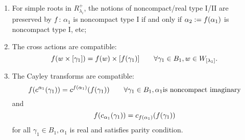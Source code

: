 \documentclass[12pt,a4paper]{amsart}
\newcommand{\trivial}[2][]{\if\relax\detokenize{#1}\relax
  {%
      \color{orange} \vspace{0em} $[$  #2 $]$
      \color{black}
  }
  \else
\ifx#1h
\ifcsname showtrivial\endcsname
{%
    \color{orange} \vspace{0em}  $[$ #2 $]$
    \color{black}
}
\fi
\else {\red Wrong argument!} \fi
\fi
}
\numberwithin{equation}{section}
\theoremstyle{remark}
\newcommand{\cross}{\times}
\begin{document}
\begin{enumerate}[KLff]
\begin{enumerate}[label=(\alph*)]
          \item For simple roots in $R^{+}_{\lambda_{i}}$, the notions of
                noncompact/real type I/II are preserved by $f$: $\alpha_{1}$
                is noncompact type I if and only if
                $\alpha_{2}:= f(\alpha_{1})$ is noncompact type I, etc;
          \item The cross actions are compatible:
                \[
                \ff(w\cross [\gamma_{1}]) = \ff(w)\cross [\ff(\gamma_{1})] \qquad \forall \gamma_{1}\in B_{1}, w\in W_{[\lambda_{1}]}.
                \]
          \item The Cayley transforms \cite{V4} are compatible:
                \[
                f( c^{\alpha_{1}} (\gamma_{1})) = c^{f(\alpha_{1})}(f(\gamma_{1})) \qquad \forall \gamma_{1}\in B_{1}, \alpha_{1} \text{is
                noncompact imaginary}
                \]
                and
                \[
                  f( c_{\alpha_{1}} (\gamma_{1})) = c_{f(\alpha_{1})}(f(\gamma_{1}))
                \]
                for all $\gamma_{1}\in B_{1}, \alpha_{1}$ is
                real and satisfies parity condition.

        \end{enumerate}
\end{enumerate}
\end{document}
